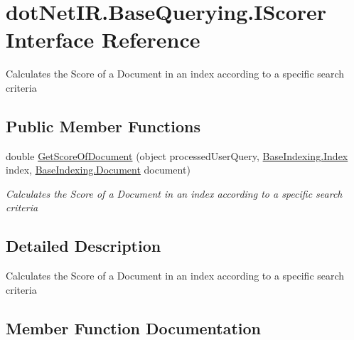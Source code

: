 \hypertarget{interfacedot_net_i_r_1_1_base_querying_1_1_i_scorer}{}\section{dot\+Net\+I\+R.\+Base\+Querying.\+I\+Scorer Interface Reference}
\label{interfacedot_net_i_r_1_1_base_querying_1_1_i_scorer}


Calculates the Score of a Document in an index according to a specific search criteria  


\subsection*{Public Member Functions}
\begin{DoxyCompactItemize}
\item 
double \hyperlink{interfacedot_net_i_r_1_1_base_querying_1_1_i_scorer_a6b20dc8deac317ca03e9878ef73899ce}{Get\+Score\+Of\+Document} (object processed\+User\+Query, \hyperlink{classdot_net_i_r_1_1_base_indexing_1_1_index}{Base\+Indexing.\+Index} index, \hyperlink{classdot_net_i_r_1_1_base_indexing_1_1_document}{Base\+Indexing.\+Document} document)
\begin{DoxyCompactList}\small\item\em Calculates the Score of a Document in an index according to a specific search criteria \end{DoxyCompactList}\end{DoxyCompactItemize}


\subsection{Detailed Description}
Calculates the Score of a Document in an index according to a specific search criteria 



\subsection{Member Function Documentation}
\hypertarget{interfacedot_net_i_r_1_1_base_querying_1_1_i_scorer_a6b20dc8deac317ca03e9878ef73899ce}{}\label{interfacedot_net_i_r_1_1_base_querying_1_1_i_scorer_a6b20dc8deac317ca03e9878ef73899ce} 
